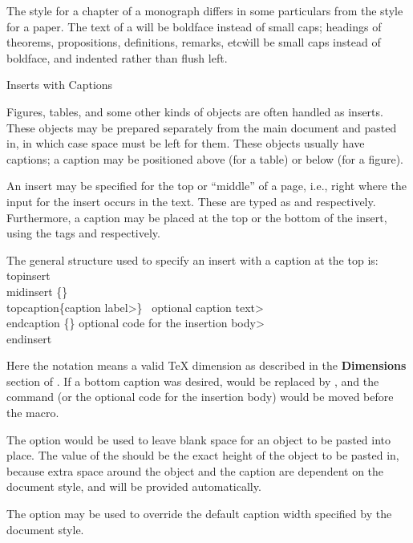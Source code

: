 The style for a chapter of a monograph differs in some particulars from the
style for a paper.  The text of a  will be boldface instead of
small caps; headings of theorems, propositions, definitions, remarks, etc\.
will be small caps instead of boldface, and indented rather than flush 
left.


\subhead Inserts with Captions \endsubhead

Figures, tables, and some other kinds of objects are often handled as
inserts.  These objects may be prepared separately from the main document
and pasted in, in which case space must be left for them.
These objects usually have captions; a caption may be positioned above (for
a table) or below (for a figure).

An insert may be specified for the top or ``middle'' of a page, i.e.,
right where the input for the insert occurs in the text.  These are
typed as  and  respectively.
Furthermore, a caption may be placed at the top or the bottom of the insert,
using the tags  and  respectively.

The general structure used to specify an insert with a caption at the top is:
\beginexample{}
\\topinsert{}\quad \\midinsert
{}\{\Dimen\}
\\topcaption\{\<caption label>\}
\ \<optional caption text>
\\endcaption
{}\{\Dimen\}\quad%
  \<optional code for the insertion body>
\\endinsert
\endexample

Here the notation \Dimen{} means a valid \TeX{} dimension as
described in the {\bf Dimensions} section of \JoT{}.
If a bottom caption was desired,  would be replaced by
, and
the  command (or the
optional code for the insertion body) would be moved before the
 macro.

The  option would be used to leave blank space for
an object to be pasted into place.  The value of the \Dimen{} should be
the exact height of the object to be pasted in, because extra space
around the object and the caption are dependent on the document style,
and will be provided automatically.

The  option may be used to override the default
caption width specified by the document style.

